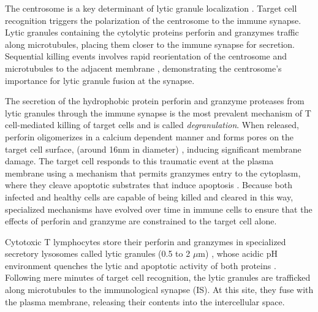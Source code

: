 The centrosome is a key determinant of lytic granule localization \cite{Stinchcombe2007, Huse2013}. Target cell recognition triggers the polarization of the centrosome to the immune synapse. Lytic granules containing the cytolytic proteins perforin and granzymes traffic along microtubules, placing them closer to the immune synapse for secretion. Sequential killing events involves rapid reorientation of the centrosome and microtubules to the adjacent membrane \cite{Kuhn2002}, demonstrating the centrosome's importance for lytic granule fusion at the synapse.

The secretion of the hydrophobic protein perforin and granzyme proteases from lytic granules through the immune synapse is the most prevalent mechanism of T cell-mediated killing of target cells \cite{Dustin2010, Stinchcombe2007} and is called \textit{degranulation}. When released, perforin oligomerizes in a calcium dependent manner \cite{Law2010} and forms pores on the target cell surface, (around 16nm in diameter) \cite{Cartwright2014}, inducing significant membrane damage. The target cell responds to this traumatic event at the plasma membrane using a mechanism that permits granzymes entry to the cytoplasm, where they cleave apoptotic substrates that induce apoptosis \cite{Keefe2005}. Because both infected and healthy cells are capable of being killed and cleared in this way, specialized mechanisms have evolved over time in immune cells to ensure that the effects of perforin and granzyme are constrained to the target cell alone.  

Cytotoxic T lymphocytes store their perforin and granzymes in specialized secretory lysosomes called lytic granules (0.5 to 2 $\mu$m) \cite{Sanchez-Ruiz2011}, whose acidic pH environment quenches the lytic and apoptotic activity of both proteins \cite{Thiery2014, Keefe2005}. Following mere minutes of target cell recognition, the lytic granules are trafficked along microtubules to the immunological synapse (IS). At this site, they fuse with the plasma membrane, releasing their contents into the intercellular space.

